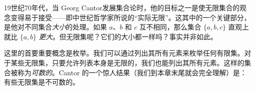 \documentclass[../../../include/open-logic-section]{subfiles}
\begin{document}


19世纪70年代，当 Georg Cantor发展集合论时，他的目标之一是使无限集合的观念变得易于接受——即中世纪哲学家所说的“实际无限”。这其中的一个关键部分，是他对不同集合\emph{大小}的处理。如果 $a$、$b$ 和 $c$ 互不相同，那么集合 $\{a, b, c\}$ 直观上就比 $\{a, b\}$ \emph{更大}。但无限集呢？它们的大小都一样吗？事实并非如此。

这里的首要重要概念是枚举。我们可以通过列出其所有元素来枚举任何有限集。对于某些无限集，只要允许列表本身是无限的，我们也能列出其所有元素。这样的集合被称为\emph{可数的}。Cantor 的一个惊人结果（我们到本章末尾就会完全理解）是：有些无限集是不可数的。
\end{document}
